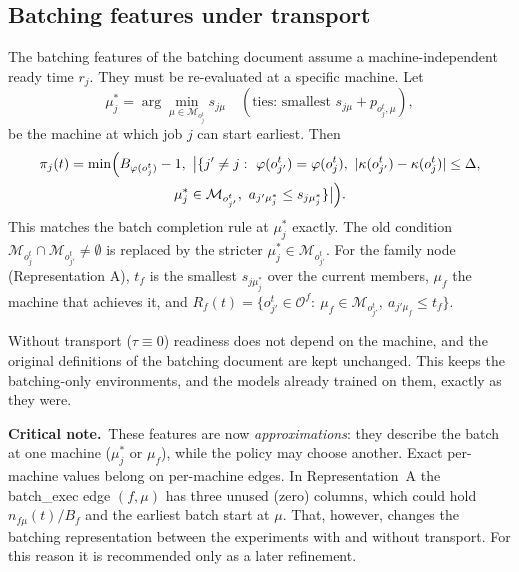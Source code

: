 \documentclass[11pt,a4paper]{article}
\newcommand{\Oset}{\mathcal{O}}
\newcommand{\Mset}{\mathcal{M}}
\newcommand{\crit}[1]{\par\smallskip\noindent\textbf{Critical note.}\ #1\par\smallskip}
\begin{document}
\subsection{Batching features under transport}
The batching features of the batching document assume a machine-independent
ready time $r_j$. They must be re-evaluated at a specific machine. Let
\begin{equation}
  \mu^\ast_j=\arg\min_{\mu\in\Mset_{o_j^t}} s_{j\mu}
  \quad(\text{ties: smallest } s_{j\mu}+p_{o_j^t,\mu}),
\end{equation}
be the machine at which job $j$ can start earliest. Then
\begin{multline}
  \pi_j(t)=\min\Bigl(B_{\varphi(o_j^t)}-1,\ \bigl|\{j'\neq j:\ \varphi(o_{j'}^t)=\varphi(o_j^t),\
  |\kappa(o_{j'}^t)-\kappa(o_j^t)|\le\Delta,\\
  \mu^\ast_j\in\Mset_{o_{j'}^t},\
  a_{j'\mu^\ast_j}\le s_{j\mu^\ast_j}\}\bigr|\Bigr).
\end{multline}
This matches the batch completion rule at $\mu^\ast_j$ exactly. The old condition
$\Mset_{o_j^t}\cap\Mset_{o_{j'}^t}\neq\emptyset$ is replaced by the stricter
$\mu^\ast_j\in\Mset_{o_{j'}^t}$. For the family node (Representation A), $t_f$ is
the smallest $s_{j\mu^\ast_j}$ over the current members, $\mu_f$ the machine
that achieves it, and $R_f(t)=\{o_{j'}^t\in\Oset^f:\ \mu_f\in\Mset_{o_{j'}^t},\
a_{j'\mu_f}\le t_f\}$.

Without transport ($\tau\equiv0$) readiness does not depend on the machine, and the
original definitions of the batching document are kept unchanged. This keeps the
batching-only environments, and the models already trained on them, exactly as
they were.

\crit{These features are now \emph{approximations}: they describe the batch at
one machine ($\mu^\ast_j$ or $\mu_f$), while the policy may choose another.
Exact per-machine values belong on per-machine edges. In Representation~A the
\textsf{batch\_exec} edge $(f,\mu)$ has three unused (zero) columns, which could
hold $n_{f\mu}(t)/B_f$ and the earliest batch start at $\mu$. That, however,
changes the batching representation between the experiments with and without
transport. For this reason it is recommended only as a later refinement.}
\end{document}
